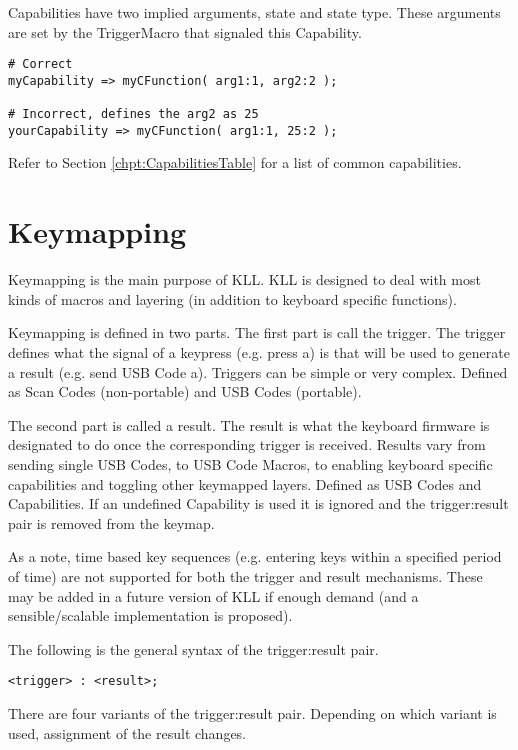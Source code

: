 \documentclass{kiibohd-template}
\begin{document}
Capabilities have two implied arguments, state and state type.
These arguments are set by the TriggerMacro that signaled this Capability.

\begin{lstlisting}
# Correct
myCapability => myCFunction( arg1:1, arg2:2 );

# Incorrect, defines the arg2 as 25
yourCapability => myCFunction( arg1:1, 25:2 );
\end{lstlisting}

Refer to Section \ref{chpt:CapabilitiesTable} for a list of common capabilities.


\chapter{Keymapping}

Keymapping is the main purpose of KLL.
KLL is designed to deal with most kinds of macros and layering (in addition to keyboard specific functions).

Keymapping is defined in two parts.
The first part is call the trigger.
The trigger defines what the signal of a keypress (e.g. press a) is that will be used to generate a result (e.g. send USB Code a).
Triggers can be simple or very complex.
Defined as Scan Codes (non-portable) and USB Codes (portable).

The second part is called a result.
The result is what the keyboard firmware is designated to do once the corresponding trigger is received.
Results vary from sending single USB Codes, to USB Code Macros, to enabling keyboard specific capabilities and toggling other keymapped layers.
Defined as USB Codes and Capabilities.
If an undefined Capability is used it is ignored and the trigger:result pair is removed from the keymap.

As a note, time based key sequences (e.g. entering keys within a specified period of time) are not supported for both the trigger and result mechanisms.
These may be added in a future version of KLL if enough demand (and a sensible/scalable implementation is proposed).

The following is the general syntax of the trigger:result pair.

\begin{lstlisting}
<trigger> : <result>;
\end{lstlisting}

There are four variants of the trigger:result pair.
Depending on which variant is used, assignment of the result changes.
\end{document}
